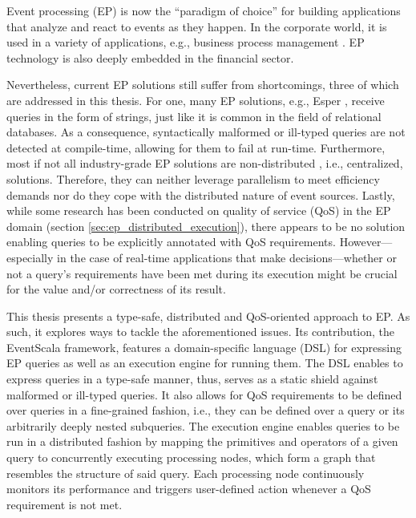 \documentclass[article, 10pt, type=bsc, colorback, accentcolor=tud8b, parskip=half, bibliography=totocnumbered]{tudthesis}
\begin{document}
Event processing (EP) is now the ``paradigm of choice'' \cite{Hinze:2009:EAE:1619258.1619260} for building applications that analyze and react to events as they happen.
In the corporate world, it is used in a variety of applications, e.g., business process management \cite{Buchmann:2012:CEA:2413516.2413519}.
EP technology is also deeply embedded in the financial sector.

Nevertheless, current EP solutions still suffer from shortcomings, three of which are addressed in this thesis.
For one, many EP solutions, e.g., Esper \cite{esper}, receive queries in the form of strings, just like it is common in the field of relational databases.
As a consequence, syntactically malformed or ill-typed queries are not detected at compile-time, allowing for them to fail at run-time.
Furthermore, most if not all industry-grade EP solutions are non-distributed \cite{Schilling:2010:DHE:1827418.1827453}, i.e., centralized, solutions.
Therefore, they can neither leverage parallelism to meet efficiency demands nor do they cope with the distributed nature of event sources.
Lastly, while some research has been conducted on quality of service (QoS) in the EP domain (section \ref{sec:ep_distributed_execution}), there appears to be no solution enabling queries to be explicitly annotated with QoS requirements.
However---especially in the case of real-time applications that make decisions---whether or not a query's requirements have been met during its execution might be crucial for the value and/or correctness of its result.

This thesis presents a type-safe, distributed and QoS-oriented approach to EP.
As such, it explores ways to tackle the aforementioned issues.
Its contribution, the EventScala framework, features a domain-specific language (DSL) for expressing EP queries as well as an execution engine for running them.
The DSL enables to express queries in a type-safe manner, thus, serves as a static shield against malformed or ill-typed queries.
It also allows for QoS requirements to be defined over queries in a fine-grained fashion, i.e., they can be defined over a query or its arbitrarily deeply nested subqueries.
The execution engine enables queries to be run in a distributed fashion by mapping the primitives and operators of a given query to concurrently executing processing nodes, which form a graph that resembles the structure of said query.
Each processing node continuously monitors its performance and triggers user-defined action whenever a QoS requirement is not met.
\end{document}
